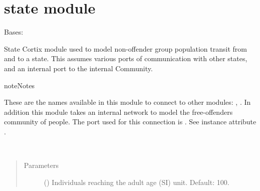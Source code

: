 \documentclass[letterpaper,10pt,openany,oneside,english]{sphinxmanual}
\begin{document}
\section{state module}
\label{\detokenize{examples_rst/state:module-state}}\label{\detokenize{examples_rst/state:state-module}}\label{\detokenize{examples_rst/state::doc}}

\begin{fulllineitems}
\label{\detokenize{examples_rst/state:state.State}}
Bases: 

State Cortix module used to model non-offender  group population transit from and to
a state. This assumes various ports of communication with other states,
and an internal port to the internal Community.

\begin{sphinxadmonition}{note}{Notes}

These are the  names available in this module to connect to other 
modules: , .
In addition this module takes an internal network to model the free-offenders
community of people. The port used for this connection is .
See instance attribute .
\end{sphinxadmonition}

\begin{fulllineitems}
\label{\detokenize{examples_rst/state:state.State.__init__}}~\begin{quote}\begin{description}
\item[{Parameters}] \leavevmode
{} () \textendash{} Individuals reaching the adult age (SI) unit. Default: 100.

\end{description}\end{quote}


\end{fulllineitems}
\end{fulllineitems}
\end{document}
